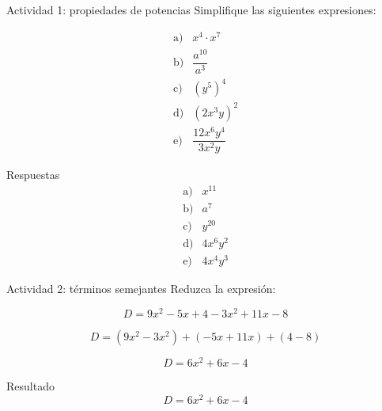 \documentclass[handout,aspectratio=169]{beamer}
\begin{document}
	\begin{frame}{Actividad 1: propiedades de potencias}
		Simplifique las siguientes expresiones:
		
		\[
		\begin{array}{ll}
			\text{a)} & x^4\cdot x^7 \\[0.2cm]
			\text{b)} & \dfrac{a^{10}}{a^3} \\[0.3cm]
			\text{c)} & (y^5)^4 \\[0.2cm]
			\text{d)} & (2x^3y)^2 \\[0.2cm]
			\text{e)} & \dfrac{12x^6y^4}{3x^2y}
		\end{array}
		\]
		
		\pause
		
		\begin{block}{Respuestas}
			\[
			\begin{array}{ll}
				\text{a)} & x^{11} \\[0.2cm]
				\text{b)} & a^7 \\[0.2cm]
				\text{c)} & y^{20} \\[0.2cm]
				\text{d)} & 4x^6y^2 \\[0.2cm]
				\text{e)} & 4x^4y^3
			\end{array}
			\]
		\end{block}
	\end{frame}
	
	\begin{frame}{Actividad 2: términos semejantes}
		Reduzca la expresión:
		
		\[
		D=9x^2-5x+4-3x^2+11x-8
		\]
		
		\pause
		
		\[
		D=(9x^2-3x^2)+(-5x+11x)+(4-8)
		\]
		
		\pause
		
		\[
		D=6x^2+6x-4
		\]
		
		\pause
		
		\begin{block}{Resultado}
			\[
			D=6x^2+6x-4
			\]
		\end{block}
	\end{frame}
	
\end{document}
